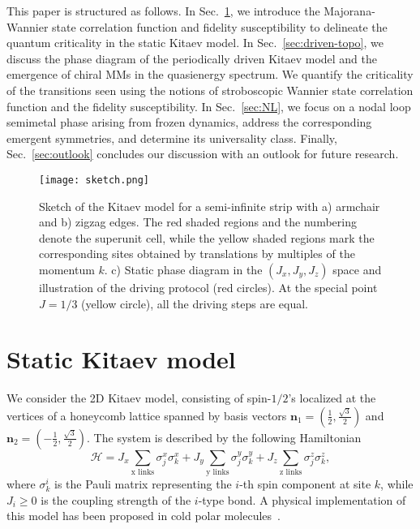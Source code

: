 \documentclass[aps,prb,twocolumn,superscriptaddress,groupedaddress]{revtex4}
\begin{document}
This paper is structured as follows.
In Sec.~\ref{sec:model}, we introduce the Majorana-Wannier state correlation function and fidelity susceptibility to delineate the quantum criticality in the static Kitaev model. 
In Sec.~\ref{sec:driven-topo},  we discuss the phase diagram of the  periodically driven Kitaev model and the emergence of chiral MMs in the quasienergy spectrum. 
We quantify the criticality  of the transitions seen using the notions of stroboscopic Wannier state correlation function and the fidelity susceptibility.
In Sec.~\ref{sec:NL}, we focus on a nodal loop semimetal phase arising from frozen dynamics, address the corresponding emergent symmetries, and determine its universality class.
Finally, Sec.~\ref{sec:outlook} concludes our discussion with an outlook for future research.

\newpage
\onecolumngrid

\begin{figure}
\centering
\texttt{[image: sketch.png]}
\caption{Sketch of the Kitaev model for a semi-infinite strip with a) armchair and b) zigzag edges. The red shaded regions and the numbering denote the superunit cell, while the yellow shaded regions mark the corresponding sites obtained by translations by multiples of the momentum $k$. c) Static phase diagram in the $(J_x, J_y, J_z)$ space and illustration of the driving protocol (red circles). At the special point $J=1/3$ (yellow circle), all the driving steps are equal.}
\label{fig:sketch}
\end{figure}

\twocolumngrid


\section{Static Kitaev model}
\label{sec:model}


We consider the 2D Kitaev model, consisting of spin-$1/2$'s localized at the vertices of a honeycomb lattice spanned by basis vectors $\mathbf{n}_1 = \left( \frac{1}{2}, \frac{\sqrt{3}}{2} \right)$ and  $\mathbf{n}_2 = \left( -\frac{1}{2}, \frac{\sqrt{3}}{2} \right)$.
The system is described by the following Hamiltonian~\cite{KitaevAnnals:2006, Thakurathi:2014}
%
\begin{equation}
\mathcal{H} = J_x \sum_{\text{x links}} \sigma_j^x \sigma_k^x  + J_y \sum_{\text{y links}} \sigma_j^y \sigma_k^y + J_z \sum_{\text{z links}} \sigma_j^z \sigma_k^z,
\end{equation}
%
where $\sigma_k^i$ is the Pauli matrix representing the $i$-th spin component at site $k$, while $J_i \ge 0$ is the coupling strength of the $i$-type bond.
A physical implementation of this model has been proposed in cold polar molecules~\cite{Micheli:2006,Gorshkov:2013}.
\end{document}
